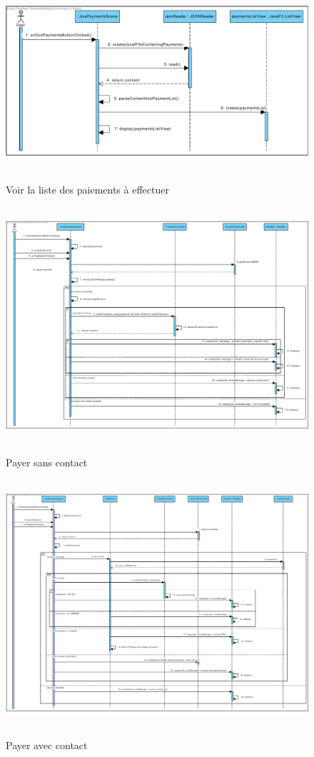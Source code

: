 \documentclass[]{report}
\begin{document}
\newpage

\begin{figure}[h!]
\hbox{
	\centering\includegraphics[width=\linewidth]{img/Sequence 3 - Extension 6.pdf}
}
\caption{Voir la liste des paiements à effectuer}
\end{figure}

\newpage

\begin{figure}[h!]
\hbox{
	\centering\includegraphics[width=\linewidth]{img/Sequence 4 - Extension 6.pdf}
}
\caption{Payer sans contact}
\end{figure}

\newpage

\begin{figure}[h!]
\hbox{
	\centering\includegraphics[width=\linewidth]{img/Sequence 5 - Extension 6.pdf}
}
\caption{Payer avec contact}
\end{figure}
\end{document}
